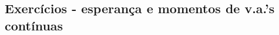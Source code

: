 \documentclass[../Notas.tex]{subfiles}
\begin{document}
\subsection{Exercícios - esperança e momentos de v.a.'s contínuas}
\end{document}
